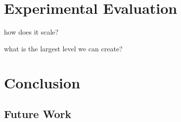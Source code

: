\documentclass[runningheads]{llncs}
\begin{document}
\section{Experimental Evaluation}
how does it scale?

what is the largest level we can create?

\section{Conclusion}
\subsection{Future Work}

%
%
%


%
\end{document}
